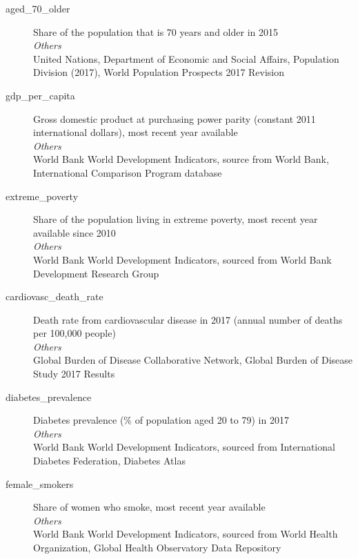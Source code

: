 \begin{description}
    \item[aged\_70\_older] 
    Share of the population that is 70 years and older in 2015\\
    \emph{\footnotesize{Others}}\\
    \footnotesize{United Nations, Department of Economic and Social Affairs, Population Division (2017), World Population Prospects 2017 Revision}\\

    \item[gdp\_per\_capita] 
    Gross domestic product at purchasing power parity (constant 2011 international dollars), most recent year available\\
    \emph{\footnotesize{Others}}\\
    \footnotesize{World Bank World Development Indicators, source from World Bank, International Comparison Program database}\\

    \item[extreme\_poverty] 
    Share of the population living in extreme poverty, most recent year available since 2010\\
    \emph{\footnotesize{Others}}\\
    \footnotesize{World Bank World Development Indicators, sourced from World Bank Development Research Group}\\

    \item[cardiovasc\_death\_rate] 
    Death rate from cardiovascular disease in 2017 (annual number of deaths per 100,000 people)\\
    \emph{\footnotesize{Others}}\\
    \footnotesize{Global Burden of Disease Collaborative Network, Global Burden of Disease Study 2017 Results}\\

    \item[diabetes\_prevalence] 
    Diabetes prevalence (\% of population aged 20 to 79) in 2017\\
    \emph{\footnotesize{Others}}\\
    \footnotesize{World Bank World Development Indicators, sourced from International Diabetes Federation, Diabetes Atlas}\\

    \item[female\_smokers] 
    Share of women who smoke, most recent year available\\
    \emph{\footnotesize{Others}}\\
    \footnotesize{World Bank World Development Indicators, sourced from World Health Organization, Global Health Observatory Data Repository}\\


\end{description}

